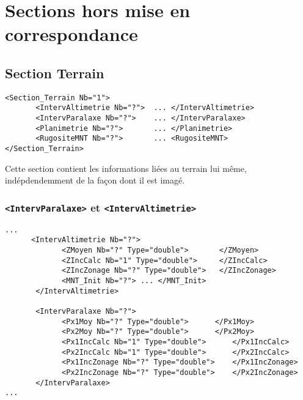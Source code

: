 \chapter{Sections hors mise en correspondance}

\label{UTIL:AUTRESEC}



\section{Section Terrain}

\begin{verbatim}
<Section_Terrain Nb="1">
       <IntervAltimetrie Nb="?">  ... </IntervAltimetrie>
       <IntervParalaxe Nb="?">    ... </IntervParalaxe>
       <Planimetrie Nb="?">       ... </Planimetrie>
       <RugositeMNT Nb="?">       ... <RugositeMNT>
</Section_Terrain>
\end{verbatim}

Cette section contient les informations li\'ees au terrain lui 
m\^eme, ind\'epdendemment de la fa\c{c}on dont il est imag\'e.


\subsection{ {\tt <IntervParalaxe>} et {\tt <IntervAltimetrie>} }

\label{SEC:Interv:Px}

\begin{verbatim}
...
      <IntervAltimetrie Nb="?">
             <ZMoyen Nb="?" Type="double">       </ZMoyen>
             <ZIncCalc Nb="1" Type="double">     </ZIncCalc>
             <ZIncZonage Nb="?" Type="double">   </ZIncZonage>
             <MNT_Init Nb="?"> ... </MNT_Init>
       </IntervAltimetrie>

       <IntervParalaxe Nb="?">
             <Px1Moy Nb="?" Type="double">      </Px1Moy>
             <Px2Moy Nb="?" Type="double">      </Px2Moy>
             <Px1IncCalc Nb="1" Type="double">      </Px1IncCalc>
             <Px2IncCalc Nb="1" Type="double">      </Px2IncCalc>
             <Px1IncZonage Nb="?" Type="double">    </Px1IncZonage>
             <Px2IncZonage Nb="?" Type="double">    </Px2IncZonage>
       </IntervParalaxe>
...
\end{verbatim}



